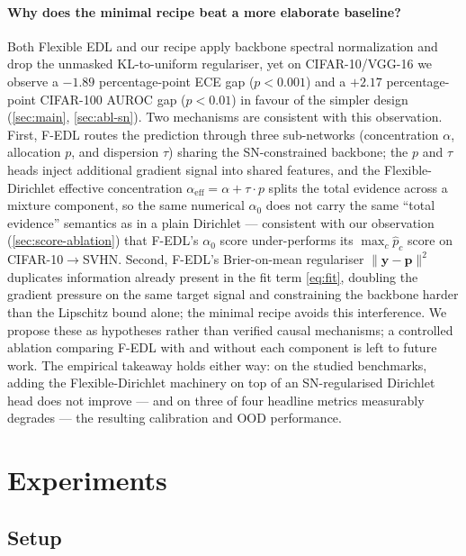 \documentclass[review,5p,times]{elsarticle}
\begin{document}
\paragraph{Why does the minimal recipe beat a more elaborate baseline?}
Both Flexible EDL \citep{yoon2025fedl} and our recipe apply backbone
spectral normalization and drop the unmasked KL-to-uniform regulariser,
yet on CIFAR-10/VGG-16 we observe a $-1.89$ percentage-point ECE gap
($p\!<\!0.001$) and a $+2.17$ percentage-point CIFAR-100 AUROC gap
($p\!<\!0.01$) in favour of the simpler design (\autoref{sec:main},
\autoref{sec:abl-sn}). Two mechanisms are consistent with this
observation. First, F-EDL routes the prediction through three
sub-networks (concentration $\alpha$, allocation $p$, and dispersion
$\tau$) sharing the SN-constrained backbone; the $p$ and $\tau$ heads
inject additional gradient signal into shared features, and the
Flexible-Dirichlet effective concentration
$\alpha_{\text{eff}}\!=\!\alpha\!+\!\tau\!\cdot\!p$ splits the total
evidence across a mixture component, so the same numerical $\alpha_0$
does not carry the same ``total evidence'' semantics as in a plain
Dirichlet --- consistent with our observation (\autoref{sec:score-ablation})
that F-EDL's $\alpha_0$ score under-performs its $\max_c\hat p_c$ score
on CIFAR-10$\to$SVHN. Second, F-EDL's Brier-on-mean regulariser
$\|\mathbf{y}-\mathbf{p}\|^2$ duplicates information already present in
the fit term \eqref{eq:fit}, doubling the gradient pressure on the same
target signal and constraining the backbone harder than the Lipschitz
bound alone; the minimal recipe avoids this interference. We propose
these as hypotheses rather than verified causal mechanisms; a controlled
ablation comparing F-EDL with and without each component is left to
future work. The empirical takeaway holds either way: on the studied
benchmarks, adding the Flexible-Dirichlet machinery on top of an
SN-regularised Dirichlet head does not improve --- and on three of four
headline metrics measurably degrades --- the resulting calibration and
OOD performance.

\section{Experiments}\label{sec:exp}

\subsection{Setup}\label{sec:setup}
\end{document}
